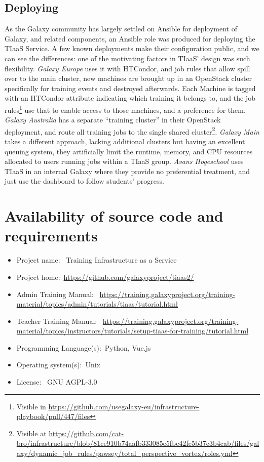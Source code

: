\documentclass[a4paper,num-refs]{oup-contemporary}
\begin{document}
\subsection{Deploying}
As the Galaxy community has largely settled on Ansible for deployment of Galaxy, and related components, an Ansible role was produced for deploying the TIaaS Service. A few known deployments make their configuration public, and we can see the differences: one of the motivating factors in TIaaS' design was such flexibility. \emph{Galaxy Europe} uses it with HTCondor, and job rules that allow spill over to the main cluster, new machines are brought up in an OpenStack cluster specifically for training events and destroyed afterwards. Each Machine is tagged with an HTCondor attribute indicating which training it belongs to, and the job rules\footnote{Visible in \url{https://github.com/usegalaxy-eu/infrastructure-playbook/pull/447/files}} use that to enable access to those machines, and a preference for them. \emph{Galaxy Australia} has a separate ``training cluster'' in their OpenStack deployment, and route all training jobs to the single shared cluster\footnote{Visible at \url{https://github.com/cat-bro/infrastructure/blob/81ce910b74aafb333085e5fbc42fe5b37c3b4cab/files/galaxy/dynamic_job_rules/pawsey/total_perspective_vortex/roles.yml}}. \emph{Galaxy Main} takes a different approach, lacking additional clusters but having an excellent queuing system, they artificially limit the runtime, memory, and CPU resources allocated to users running jobs within a TIaaS group. \emph{Avans Hogeschool} uses TIaaS in an internal Galaxy where they provide no preferential treatment, and just use the dashboard to follow students' progress.

\section{Availability of source code and requirements}

\begin{itemize}
\item Project name: ~Training Infrastructure as a Service
\item Project home:~\url{https://github.com/galaxyproject/tiaas2/}
\item Admin Training Manual: ~\url{https://training.galaxyproject.org/training-material/topics/admin/tutorials/tiaas/tutorial.html}
\item Teacher Training Manual: ~\url{https://training.galaxyproject.org/training-material/topics/instructors/tutorials/setup-tiaas-for-training/tutorial.html}
\item Programming Language(s):~Python, Vue.js 
\item Operating system(s):~Unix
\item License: ~GNU AGPL-3.0
\end{itemize}
\end{document}
